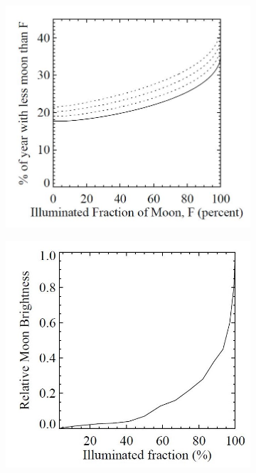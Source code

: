 \begin{figure}
\centering
\begin{subfigure}[b]{0.45\textwidth}
\includegraphics[width=\textwidth]{chapters/pix/SelEff/IlluminatedMoonFrac_Twilight.JPG}
\caption{}
\end{subfigure}
\hspace*{3mm}
\begin{subfigure}[b]{0.45\textwidth}
\includegraphics[width=\textwidth]{chapters/pix/SelEff/IlluminatedMoon_brightness.JPG}

\end{subfigure}
\end{figure}
